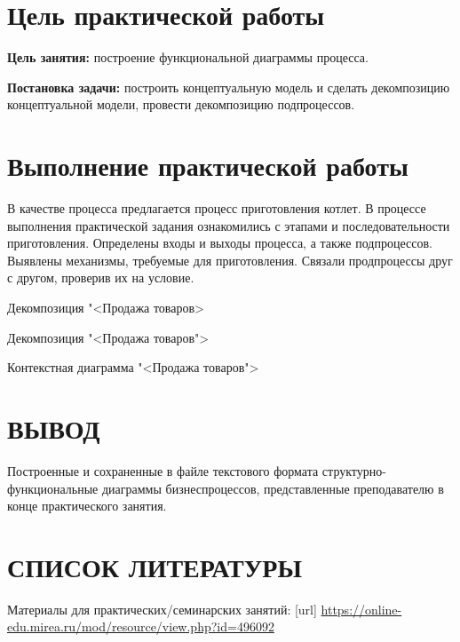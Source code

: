 \graphicspath{{./third/img/}}

\section{Цель практической работы}
\textbf{Цель занятия:}
построение функциональной диаграммы процесса.\par
\textbf{Постановка задачи:} построить концептуальную модель и сделать
декомпозицию концептуальной модели, провести декомпозицию подпроцессов.\par

\section{Выполнение практической работы}
В качестве процесса предлагается процесс приготовления котлет.
В процессе выполнения практической задания ознакомились
с этапами и последовательности приготовления.
Определены входы и выходы процесса, а также подпроцессов. Выявлены механизмы,
требуемые для приготовления. Связали продпроцессы друг с другом, проверив их
на условие.

\begin{image}
	\caption{Декомпозиция "<Продажа товаров>}
	\label{fig:IDEF0:a1.3}
\end{image}

\begin{image}
	\caption{Декомпозиция "<Продажа товаров">}
	\label{fig:IDEF0:a1}
\end{image}

\begin{image}
	\caption{Контекстная диаграмма "<Продажа товаров">}
	\label{fig:IDEF0:a0}
\end{image}

\section*{ВЫВОД}
Построенные и сохраненные в
файле текстового формата структурно-функциональные диаграммы бизнеспроцессов,
представленные преподавателю в конце практического занятия.

\section*{СПИСОК ЛИТЕРАТУРЫ}
\begin{thebibliography}{}
    \bibitem{}  Материалы для практических/семинарских занятий: [url] 
		\url{https://online-edu.mirea.ru/mod/resource/view.php?id=496092}
\end{thebibliography}

